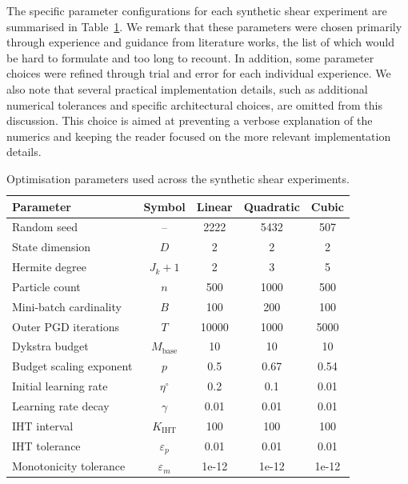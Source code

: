 The specific parameter configurations for each synthetic shear experiment are summarised in Table~\ref{tab:optimisation_parameters}. We remark that these parameters were chosen primarily through experience and guidance from literature works, the list of which would be hard to formulate and too long to recount. In addition, some parameter choices were refined through trial and error for each individual experience. We also note that several practical implementation details, such as additional numerical tolerances and specific architectural choices, are omitted from this discussion. This choice is aimed at preventing a verbose explanation of the numerics and keeping the reader focused on the more relevant implementation details.

\begin{table}[htbp]
    \centering
    \caption{Optimisation parameters used across the synthetic shear experiments.}
    \begin{tabular}{lcccc}
        \toprule
        \textbf{Parameter} & \textbf{Symbol} & \textbf{Linear} & \textbf{Quadratic} & \textbf{Cubic} \\
        \midrule
        Random seed & --                            & 2222 & 5432 & 507 \\
        State dimension & $D$                       & 2 & 2 & 2 \\
        Hermite degree & $J_k + 1$                  & 2 & 3 & 5 \\
        Particle count & $n$                        & 500 & 1000 & 500 \\
        Mini-batch cardinality & $B$                & 100 & 200 & 100 \\
        Outer PGD iterations & $T$                  & 10000 & 1000 & 5000 \\
        Dykstra budget & $M_{\mathrm{base}}$        & 10 & 10 & 10 \\
        Budget scaling exponent & $p$               & 0.5 & 0.67 & 0.54 \\
        Initial learning rate & $\eta^\circ$        & 0.2 & 0.1 & 0.01 \\
        Learning rate decay & $\gamma$              & 0.01 & 0.01 & 0.01 \\
        IHT interval & $K_{\mathrm{IHT}}$           & 100 & 100 & 100 \\
        IHT tolerance & $\varepsilon_p$             & 0.01 & 0.01 & 0.01 \\
        Monotonicity tolerance & $\varepsilon_m$    & 1e-12 & 1e-12 & 1e-12 \\
        
        \bottomrule
    \end{tabular}
    \label{tab:optimisation_parameters}
\end{table}

